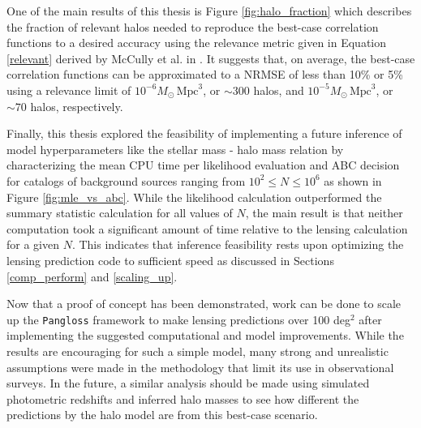 \documentclass[%
 reprint,
 amsmath,amssymb,
 aps,nofootinbib
]{revtex4-1}
\begin{document}
One of the main results of this thesis is Figure \ref{fig:halo_fraction} which describes the fraction of relevant halos needed to reproduce the best-case correlation functions to a desired accuracy using the relevance metric given in Equation \eqref{relevant} derived by McCully et al. in \cite{mccully}. It suggests that, on average, the best-case correlation functions can be approximated to a NRMSE of less than 10\% or 5\% using a relevance limit of ${10^{-6}M_\odot\,\text{Mpc}^3}$, or $\sim300$ halos, and ${10^{-5}M_\odot\,\text{Mpc}^3}$, or $\sim70$ halos, respectively.

Finally, this thesis explored the feasibility of implementing a future inference of model hyperparameters like the stellar mass - halo mass relation by characterizing the mean CPU time per likelihood evaluation and ABC decision for catalogs of background sources ranging from $10^2\leq N\leq10^6$ as shown in Figure \ref{fig:mle_vs_abc}. While the likelihood calculation outperformed the summary statistic calculation for all values of $N$, the main result is that neither computation took a significant amount of time relative to the lensing calculation for a given $N$. This indicates that inference feasibility rests upon optimizing the lensing prediction code to sufficient speed as discussed in Sections \ref{comp_perform} and \ref{scaling_up}.

Now that a proof of concept has been demonstrated, work can be done to scale up the \texttt{Pangloss} framework to make lensing predictions over 100 deg$^2$ after implementing the suggested computational and model improvements. While the results are encouraging for such a simple model, many strong and unrealistic assumptions were made in the methodology that limit its use in observational surveys. In the future, a similar analysis should be made using simulated photometric redshifts and inferred halo masses to see how different the predictions by the halo model are from this best-case scenario.
\end{document}
